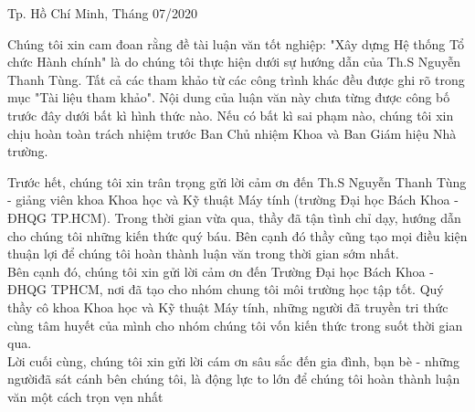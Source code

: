 \documentclass[12pt, a4paper]{report}
\begin{document}
\begin{titlepage}
\begin{table}[H]
\begin{tabular}{rlr}
\end{tabular}
\end{table}
\vspace{3cm}
\begin{center}
{\footnotesize Tp. Hồ Chí Minh, Tháng 07/2020}
\end{center}
\end{titlepage}
\begin{declaration}
Chúng tôi xin cam đoan rằng đề tài luận văn tốt nghiệp: "Xây dựng Hệ thống Tổ chức Hành chính" là do chúng tôi thực hiện dưới sự hướng dẫn của Th.S Nguyễn Thanh Tùng. Tất cả các tham khảo từ
các công trình khác đều được ghi rõ trong mục "Tài liệu tham khảo". Nội dung của luận văn này chưa từng được công bố trước đây dưới bất kì hình thức nào. Nếu có bất kì sai phạm nào, chúng tôi xin chịu hoàn toàn trách nhiệm trước Ban Chủ nhiệm Khoa và Ban Giám hiệu Nhà trường.
\newline
{}
\end{declaration}
\newpage
\begin{thankyou}
Trước hết, chúng tôi xin trân trọng gửi lời cảm ơn đến Th.S Nguyễn Thanh Tùng - giảng viên khoa Khoa học và Kỹ thuật Máy tính (trường Đại học Bách Khoa - ĐHQG TP.HCM). Trong thời gian vừa qua, thầy đã tận tình chỉ dạy, hướng dẫn cho chúng tôi những kiến thức quý báu. Bên cạnh đó thầy cũng tạo mọi điều kiện thuận lợi để chúng tôi hoàn thành luận văn trong thời gian sớm nhất.\\
\indent Bên cạnh đó, chúng tôi xin gửi lời cảm ơn đến Trường Đại học Bách Khoa - ĐHQG TPHCM, nơi đã tạo cho nhóm chung tôi môi trường học tập tốt. Quý thầy cô khoa Khoa học và Kỹ thuật Máy tính, những người đã truyền tri thức cùng tâm huyết của mình cho nhóm chúng tôi vốn kiến thức trong suốt thời gian qua.\\
\indent Lời cuối cùng, chúng tôi xin gửi lời cám ơn sâu sắc đến gia đình, bạn bè - những ngườiđã sát cánh bên chúng tôi, là động lực to lớn để chúng tôi hoàn thành luận văn một cách trọn vẹn nhất
\newline
{}
\end{thankyou}
\end{document}
